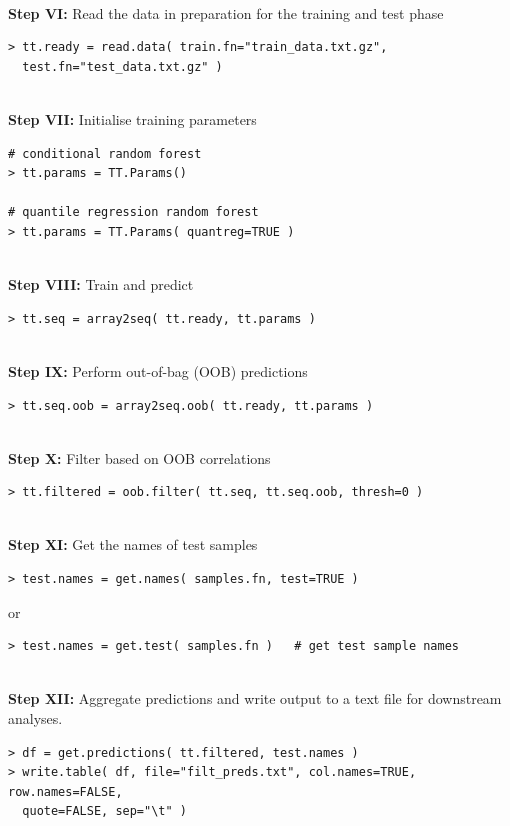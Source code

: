 \documentclass[a4paper,12pt]{article}
\begin{document}
\noindent\\
\textbf{Step VI:} Read the data in preparation for the training and test phase
\begin{verbatim}
> tt.ready = read.data( train.fn="train_data.txt.gz", 
  test.fn="test_data.txt.gz" )
\end{verbatim}

\noindent\\
\textbf{Step VII:} Initialise training parameters
\begin{verbatim}
# conditional random forest
> tt.params = TT.Params()

# quantile regression random forest
> tt.params = TT.Params( quantreg=TRUE )
\end{verbatim}

\noindent\\
\textbf{Step VIII:} Train and predict
\begin{verbatim}
> tt.seq = array2seq( tt.ready, tt.params )
\end{verbatim}

\noindent\\
\textbf{Step IX:} Perform out-of-bag (OOB) predictions
\begin{verbatim}
> tt.seq.oob = array2seq.oob( tt.ready, tt.params )
\end{verbatim}

\noindent\\
\textbf{Step X:} Filter based on OOB correlations
\begin{verbatim}
> tt.filtered = oob.filter( tt.seq, tt.seq.oob, thresh=0 )
\end{verbatim}

\noindent\\
\textbf{Step XI:} Get the names of test samples
\begin{verbatim}
> test.names = get.names( samples.fn, test=TRUE )
\end{verbatim}
or 
\begin{verbatim}
> test.names = get.test( samples.fn )   # get test sample names
\end{verbatim}

\noindent\\
\textbf{Step XII:} Aggregate predictions and write output to a text file for downstream analyses.
\begin{verbatim}
> df = get.predictions( tt.filtered, test.names )
> write.table( df, file="filt_preds.txt", col.names=TRUE, row.names=FALSE, 
  quote=FALSE, sep="\t" )
\end{verbatim}
\end{document}
